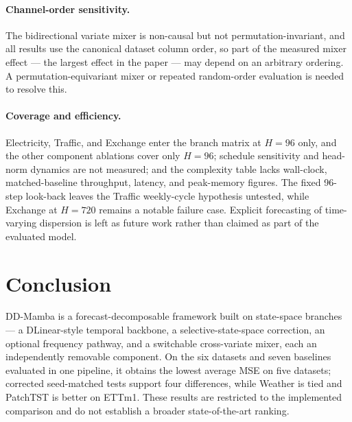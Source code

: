 \documentclass[review,12pt]{elsarticle}
\newcommand{\model}{DD-Mamba}
\begin{document}
\paragraph{Channel-order sensitivity.} The bidirectional variate mixer is
non-causal but not permutation-invariant, and all results use the canonical
dataset column order, so part of the measured mixer effect --- the largest
effect in the paper --- may depend on an arbitrary ordering. A
permutation-equivariant mixer or repeated random-order evaluation is needed
to resolve this.

\paragraph{Coverage and efficiency.} Electricity, Traffic, and Exchange
enter the branch matrix at $H{=}96$ only, and the other component ablations
cover only $H{=}96$; schedule sensitivity and head-norm dynamics are not
measured; and the complexity table lacks wall-clock, matched-baseline
throughput, latency, and peak-memory figures. The fixed 96-step look-back
leaves the Traffic weekly-cycle hypothesis untested, while Exchange at
$H{=}720$ remains a notable failure case. Explicit forecasting of
time-varying dispersion is left as future work rather than claimed as part
of the evaluated model.

\section{Conclusion}
\label{sec:conclusion}

\model{} is a forecast-decomposable framework built on state-space
branches --- a DLinear-style temporal backbone, a selective-state-space
correction, an optional frequency pathway, and a switchable cross-variate
mixer, each an independently removable component. On the six datasets and
seven baselines evaluated in one pipeline, it obtains the lowest average MSE
on five datasets; corrected seed-matched tests support four differences,
while Weather is tied and PatchTST is better on ETTm1. These results are
restricted to the implemented comparison and do not establish a broader
state-of-the-art ranking.
\end{document}
